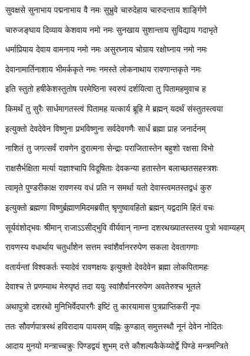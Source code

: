 \twolineshloka
{सुवक्षसे सुनाभाय पद्मनाभाय वै नमः}
{सुभ्रुवे चारुदेहाय चारुदन्ताय शार्ङ्गिणे} %

\twolineshloka
{चारुजङ्घाय दिव्याय केशवाय नमो नमः}
{सुनखाय सुशान्ताय सुविद्याय गदाभृते} %

\twolineshloka
{धर्माप्रियाय देवाय वामनाय नमो नमः}
{असुरघ्नाय चोग्राय रक्षोघ्नाय नमो नमः} %

\twolineshloka
{देवानामार्तिनाशाय भीमर्ककृते नमः}
{नमस्ते लोकनाथाय रावणान्तकृते नमः} %


\twolineshloka
{इति स्तुतो हषीकेशस्तुतोष परमेष्ठिना}
{स्वरुपं दर्शयित्वा तु पितामहमुवाच ह} %

\twolineshloka
{किमर्थं तु सुरैः सार्धमागतस्त्वं पितामह}
{यत्कार्य ब्रूहि मे ब्रह्मन् यदर्थं संस्तुतस्त्वया} %

\twolineshloka
{इत्युक्तो देवदेवेन विष्णुना प्रभविष्णुना}
{सर्वदेवगणैः सार्धं ब्रह्मा प्राह जनार्दनम्} %


\twolineshloka
{नाशितं तु जगत्सर्वं रावणेन दुरात्मना}
{सेन्द्राः पराजितास्तेन बहुशो रक्षसा विभो} %

\twolineshloka
{राक्षसैर्भक्षिता मर्त्या यज्ञाश्चापि विदूषिताः}
{देवकन्या हतास्तेन बलाच्छतसहस्त्रशः} %

\twolineshloka
{त्वामृते पुण्डरीकाक्ष रावणस्य वधं प्रति}
{न समर्था यतो देवास्त्वमतस्तद्वधं कुरु} %

\twolineshloka
{इत्युक्तो ब्रह्मणा विष्णुर्ब्रह्माणमिदमब्रवीत्}
{श्रृणुष्वावहितो ब्रह्मन् यद्वदामि हितं वचः} %

\twolineshloka
{सूर्यवंशोद्भवः श्रीमान् राजाऽऽसीद्भुवि वीर्यवान्}
{नाम्ना दशरथख्यातस्तस्य पुत्रो भवाम्यहम्} %

\twolineshloka
{रावणस्य वधार्थाय चतुर्धांशेन सत्तम}
{स्वांशैर्वानररुपेण सकला देवतागणाः} %

\twolineshloka
{वतार्यन्तां विश्वकर्तः स्यादेवं रावणक्षयः}
{इत्युक्तो देवदेवेन ब्रह्मा लोकपितामहः} %

\twolineshloka
{देवाश्च ते प्रणम्याथ मेरुपृष्ठं तदा ययुः}
{स्वांशैर्वानररुपेण अवतेरुश्च भूतले} %

\twolineshloka
{अथापुत्रो दशरथो मुनिभिर्वेदपारगैः}
{इष्टिं तु कारयामास पुत्रप्राप्तिकरी नृपः} %

\twolineshloka
{ततः सौवर्णपात्रस्थं हविरादाय पायसम्}
{वह्निः कुण्डात् समुत्तस्थौ नूनं देवेन नोदितः} %

\twolineshloka
{आदाय मुनयो मन्त्राच्चक्रुः पिण्डद्वयं शुभम्}
{दत्ते कौशल्यकैकेय्योर्द्वे पिण्डे मन्त्रमन्त्रिते} %

